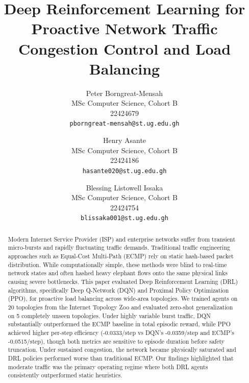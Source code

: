 \documentclass[10pt,twocolumn,letterpaper]{article}
\begin{document}
\title{Deep Reinforcement Learning for Proactive Network Traffic Congestion Control and Load Balancing}

\author{
\small Peter Borngreat-Mensah\\
\small MSc Computer Science, Cohort B\\
\small 22424679\\
\small {\tt\scriptsize pborngreat-mensah@st.ug.edu.gh}
\and
\small Henry Asante\\
\small MSc Computer Science, Cohort B\\
\small 22424186\\
\small {\tt\scriptsize hasante020@st.ug.edu.gh}
\and
\small Blessing Listowell Issaka\\
\small MSc Computer Science, Cohort B\\
\small 22424754\\
\small {\tt\scriptsize blissaka001@st.ug.edu.gh}
}

\maketitle

\begin{abstract}
Modern Internet Service Provider (ISP) and enterprise networks suffer from transient micro-bursts and rapidly fluctuating traffic demands. Traditional traffic engineering approaches such as Equal-Cost Multi-Path (ECMP) rely on static hash-based packet distribution. While computationally simple, these methods were blind to real-time network states and often hashed heavy elephant flows onto the same physical links causing severe bottlenecks. This paper evaluated Deep Reinforcement Learning (DRL) algorithms, specifically Deep Q-Network (DQN) and Proximal Policy Optimization (PPO), for proactive load balancing across wide-area topologies. We trained agents on 20 topologies from the Internet Topology Zoo and evaluated zero-shot generalization on 5 completely unseen topologies. Under highly variable burst traffic, DQN substantially outperformed the ECMP baseline in total episodic reward, while PPO achieved higher per-step efficiency (-0.0333/step vs DQN's -0.0359/step and ECMP's -0.0515/step), though both metrics are sensitive to episode duration before safety truncation. Under sustained congestion, the network became physically saturated and DRL policies performed worse than traditional ECMP. Our findings highlighted that moderate traffic was the primary operating regime where both DRL agents consistently outperformed static heuristics.
\end{abstract}
\end{document}

